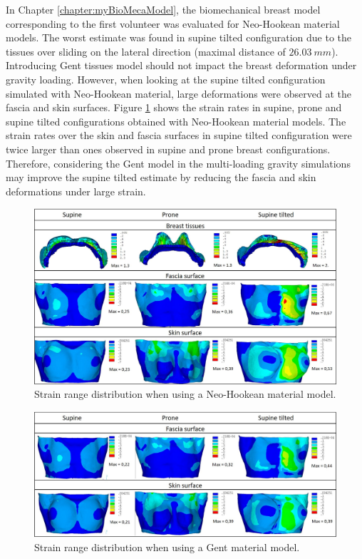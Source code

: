  In Chapter \ref{chapter:myBioMecaModel}, the biomechanical breast model corresponding to the first volunteer was evaluated for Neo-Hookean material models. The worst estimate was found in supine tilted configuration due to the tissues over sliding on the lateral direction (maximal distance of $26.03 \ mm$). Introducing Gent tissues model should not impact the breast deformation under gravity loading. However, when looking at the supine tilted configuration simulated with Neo-Hookean material, large deformations were observed at the fascia and skin surfaces. Figure \ref{fig:strain_range_neo} shows the strain rates in supine, prone and supine tilted configurations obtained with Neo-Hookean material models. The strain rates over the skin and fascia surfaces in supine tilted configuration were twice larger than ones observed in supine and prone breast configurations. Therefore, considering the Gent model in the multi-loading gravity simulations may improve the supine tilted estimate by reducing the fascia and skin deformations under large strain. 


\begin{figure}[!h]
\centering
\includegraphics[width=\textwidth,keepaspectratio]{figures/strain_range_neo.jpg} 
\caption{Strain range distribution when using a Neo-Hookean material model. }\label{fig:strain_range_neo}
\end{figure}
 

\begin{figure}[!h]
\centering
\includegraphics[width=\textwidth,keepaspectratio]{figures/strain_range_gent.jpg} 
\caption{Strain range distribution when using a Gent material model. }\label{fig:strain_range_gent}
\end{figure}

